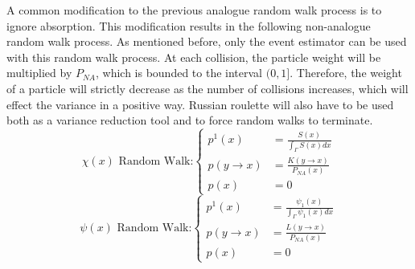 A common modification to the previous analogue random walk process is to 
ignore absorption. This modification results in the following non-analogue
random walk process. As mentioned before, only the event estimator can be used
with this random walk process. At each collision, the particle weight will be
multiplied by $P_{NA}$, which is bounded to the interval $(0,1]$. Therefore,
the weight of a particle will strictly decrease as the number of collisions
increases, which will effect the variance in a positive way. Russian roulette
will also have to be used both as a variance reduction tool and to force random
walks to terminate.
\begin{equation}
  \chi(x)\text{ Random Walk:}
  \begin{cases}
    p^1(x) & = \frac{S(x)}{\int_{\Gamma} S(x)dx} \\
    p(y \to x) &  = \frac{K(y \to x)}{P_{NA}(x)} \\
    p(x) & = 0
  \end{cases}
  \label{eq:mc_random_walk_emission_dens_nonan}
\end{equation}
\begin{equation}
  \psi(x)\text{ Random Walk:}
  \begin{cases}
    p^1(x) & = \frac{\psi_1(x)}{\int_{\Gamma}\psi_1(x)dx} \\
    p(y \to x) & = \frac{L(y \to x)}{P_{NA}(x)} \\
    p(x) & = 0
  \end{cases}
  \label{eq:mc_random_walk_collision_dens_nonan}
\end{equation}

